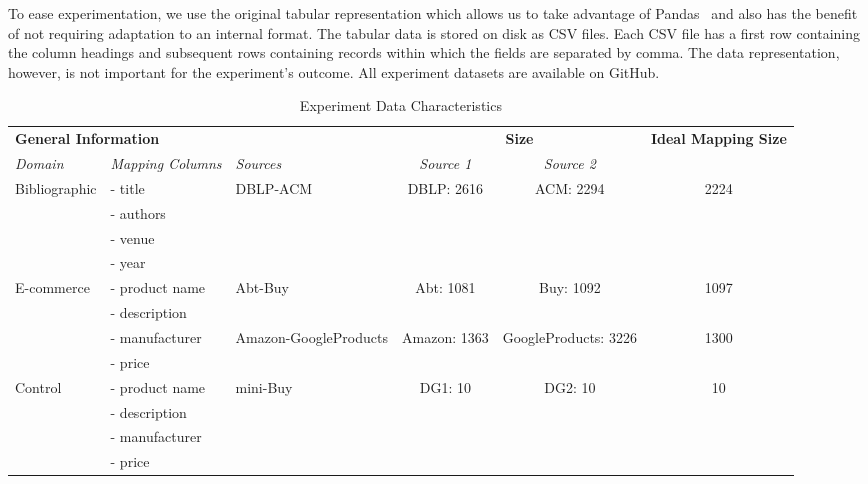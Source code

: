 To ease experimentation, we use the original tabular representation
which allows us to take advantage of Pandas~\cite{pandas2010,pandas2023}
and also has the benefit of not requiring adaptation to an internal format.
The tabular data is stored on disk as CSV files.
Each CSV file has a first row containing the column headings and subsequent
rows containing records within which the fields are separated by comma.
The data representation, however, is not important for the experiment's
outcome. All experiment datasets are available on GitHub\cite{expdata2023}.

\begin{table*}[htbp]
    \centering
    \begin{tabular}{|l|l|l|c|c|c|}
        \bottomrule
        \multicolumn{3}{|l|}{\textbf{General Information}} & \multicolumn{2}{|c|}{\textbf{Size}} & \multirow{2}{*}{\textbf{Ideal Mapping Size}}\\
        \cline{0-4}
        \textit{Domain} & \textit{Mapping Columns} & \textit{Sources} & \textit{Source 1} & \textit{Source 2} & \\
        \hline
        \multirow{4}{*}{Bibliographic} & - title & \multirow{4}{*}{DBLP-ACM} & \multirow{4}{*}{DBLP: 2616} & \multirow{4}{*}{ACM: 2294} & \multirow{4}{*}{2224} \\
        & - authors & & & &\\
        & - venue & & & &\\
        & - year & & & &\\
        \hline
        \multirow{4}{*}{E-commerce} & - product name & \multirow{2}{*}{Abt-Buy} & \multirow{2}{*}{Abt: 1081} & \multirow{2}{*}{Buy: 1092} & \multirow{2}{*}{1097} \\
        & - description & & & &\\
        \cline{3-6}
        & - manufacturer & \multirow{2}{*}{Amazon-GoogleProducts} & \multirow{2}{*}{Amazon: 1363} & \multirow{2}{*}{GoogleProducts: 3226} & \multirow{2}{*}{1300} \\
        & - price & & & &\\
        \hline
        \multirow{4}{*}{Control} & - product name & \multirow{4}{*}{mini-Buy} & \multirow{4}{*}{DG1: 10} & \multirow{4}{*}{DG2: 10} & \multirow{4}{*}{10} \\
        & - description & & & &\\
        & - manufacturer & & & &\\
        & - price & & & &\\
        \hline
    \end{tabular}
    \caption{Experiment Data Characteristics}\label{tab:dsattrs}
\end{table*}

